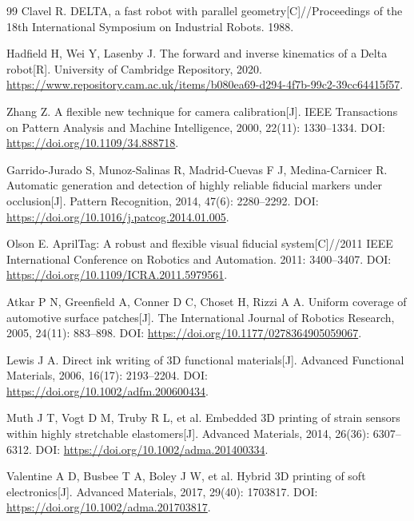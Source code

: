 ﻿\documentclass[UTF8,zihao=-4,fontset=windows]{ctexart}
\begin{document}
\begin{thebibliography}{99}
Clavel R. DELTA, a fast robot with parallel geometry[C]//Proceedings of the 18th International Symposium on Industrial Robots. 1988.

Hadfield H, Wei Y, Lasenby J. The forward and inverse kinematics of a Delta robot[R]. University of Cambridge Repository, 2020. \url{https://www.repository.cam.ac.uk/items/b080ea69-d294-4f7b-99c2-39cc64415f57}.

Zhang Z. A flexible new technique for camera calibration[J]. IEEE Transactions on Pattern Analysis and Machine Intelligence, 2000, 22(11): 1330--1334. DOI: \url{https://doi.org/10.1109/34.888718}.

Garrido-Jurado S, Munoz-Salinas R, Madrid-Cuevas F J, Medina-Carnicer R. Automatic generation and detection of highly reliable fiducial markers under occlusion[J]. Pattern Recognition, 2014, 47(6): 2280--2292. DOI: \url{https://doi.org/10.1016/j.patcog.2014.01.005}.

Olson E. AprilTag: A robust and flexible visual fiducial system[C]//2011 IEEE International Conference on Robotics and Automation. 2011: 3400--3407. DOI: \url{https://doi.org/10.1109/ICRA.2011.5979561}.

Atkar P N, Greenfield A, Conner D C, Choset H, Rizzi A A. Uniform coverage of automotive surface patches[J]. The International Journal of Robotics Research, 2005, 24(11): 883--898. DOI: \url{https://doi.org/10.1177/0278364905059067}.

Lewis J A. Direct ink writing of 3D functional materials[J]. Advanced Functional Materials, 2006, 16(17): 2193--2204. DOI: \url{https://doi.org/10.1002/adfm.200600434}.

Muth J T, Vogt D M, Truby R L, et al. Embedded 3D printing of strain sensors within highly stretchable elastomers[J]. Advanced Materials, 2014, 26(36): 6307--6312. DOI: \url{https://doi.org/10.1002/adma.201400334}.

Valentine A D, Busbee T A, Boley J W, et al. Hybrid 3D printing of soft electronics[J]. Advanced Materials, 2017, 29(40): 1703817. DOI: \url{https://doi.org/10.1002/adma.201703817}.
\end{thebibliography}
\end{document}
